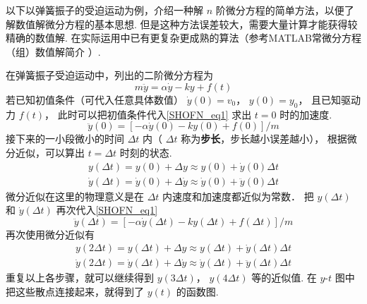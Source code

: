 

以下以弹簧振子的受迫运动为例，介绍一种解 $n$ 阶微分方程的简单方法，以便了解数值解微分方程的基本思想. 但是这种方法误差较大，需要大量计算才能获得较精确的数值解. 在实际运用中已有更复杂更成熟的算法（参考MATLAB常微分方程（组）数值解简介%
）.

在弹簧振子受迫运动中，列出的二阶微分方程为
\begin{equation}\label{SHOFN_eq1}
m\ddot y = \alpha \dot y - ky + f(t)
\end{equation}
若已知初值条件（可代入任意具体数值） $\dot y(0) = v_0$，  $y(0) = y_0$， 且已知驱动力 $f(t)$， 此时可以把初值条件代入\autoref{SHOFN_eq1} 求出 $t = 0$ 时的加速度.
\begin{equation}
\ddot y(0) = [- \alpha \dot y(0) - ky(0) + f(0)]/m
\end{equation}
接下来的一小段微小的时间 $\Delta t$ 内（ $\Delta t$ 称为\textbf{步长}，步长越小误差越小）， 根据微分近似，可以算出 $t = \Delta t$ 时刻的状态.
\begin{gather}
y(\Delta t) =  y(0) + \Delta y \approx y(0) + \dot y(0) \Delta t\\
\dot y(\Delta t) = \dot y(0) + \Delta \dot y \approx \dot y(0) + \ddot y(0) \Delta t
\end{gather}
微分近似在这里的物理意义是在 $\Delta t$ 内速度和加速度都近似为常数． 把 $y(\Delta t)$ 和 $\dot y(\Delta t)$ 再次代入\autoref{SHOFN_eq1}
\begin{equation}
\ddot y(\Delta t) = [- \alpha \dot y(\Delta t) - ky(\Delta t) + f(\Delta t)]/m
\end{equation}
再次使用微分近似有
\begin{gather}
y(2\Delta t) =  y(\Delta t) + \Delta y \approx y(\Delta t) + \dot y(\Delta t) \Delta t\\
\dot y(2\Delta t) = \dot y(\Delta t) + \Delta \dot y \approx \dot y(\Delta t) + \ddot y(\Delta t) \Delta t
\end{gather}
重复以上各步骤，就可以继续得到 $y(3\Delta t)$，  $y(4\Delta t)$ 等的近似值. 在 $y$-$t$ 图中把这些散点连接起来，就得到了 $y(t)$ 的函数图.

